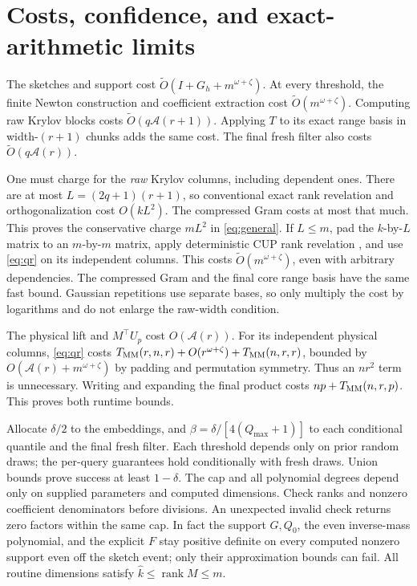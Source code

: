 \documentclass[11pt]{article}
\newcommand{\rank}{\operatorname{rank}}
\newcommand{\tO}{\widetilde O}
\newcommand{\MM}{T_{\rm MM}}
\newcommand{\Ac}{\mathcal A}
\begin{document}
\section{Costs, confidence, and exact-arithmetic limits}
The sketches and support cost \(\tO(I+G_h+m^{\omega+\zeta})\).
At every threshold, the finite Newton construction and coefficient
extraction cost \(\tO(m^{\omega+\zeta})\). Computing raw Krylov
blocks costs \(\tO(q\Ac(r+1))\). Applying \(T\) to its exact range
basis in width-\((r+1)\) chunks adds the same cost.
The final fresh filter also costs \(\tO(q\Ac(r))\).

One must charge for the \emph{raw} Krylov columns, including dependent
ones. There are at most \(L=(2q+1)(r+1)\), so conventional exact rank
revelation and orthogonalization cost \(O(kL^2)\). The compressed Gram
costs at most that much. This proves the conservative charge \(mL^2\)
in \eqref{eq:general}. If \(L\leq m\), pad the \(k\)-by-\(L\)
matrix to an \(m\)-by-\(m\) matrix, apply deterministic CUP rank
revelation \cite{jps}, and use \eqref{eq:qr} on its independent columns.
This costs \(\tO(m^{\omega+\zeta})\), even with arbitrary dependencies.
The compressed Gram and the final core range basis have the same fast
bound. Gaussian repetitions use separate bases, so only multiply the
cost by logarithms and do not enlarge the raw-width condition.

The physical lift and \(M^\top U_p\) cost \(O(\Ac(r))\).
For its independent physical columns, \eqref{eq:qr} costs
\(\MM(r,n,r)+O(r^{\omega+\zeta})+\MM(n,r,r)\), bounded by
\(O(\Ac(r)+m^{\omega+\zeta})\) by padding and permutation symmetry.
Thus an \(nr^2\) term is unnecessary. Writing and expanding the final
product costs \(np+\MM(n,r,p)\). This proves both runtime bounds.

Allocate \(\delta/2\) to the embeddings, and
\(\beta=\delta/[4(Q_{\max}+1)]\) to each conditional quantile and the
final fresh filter. Each threshold depends only on prior random draws;
the per-query guarantees hold conditionally with fresh draws. Union
bounds prove success at least \(1-\delta\). The cap and all polynomial
degrees depend only on supplied parameters and computed dimensions.
Check ranks and nonzero coefficient denominators before divisions.
An unexpected invalid check returns zero factors within the same cap.
In fact the support \(G,Q_0\), the even inverse-mass polynomial, and
the explicit \(F\) stay positive definite on every computed nonzero
support even off the sketch event; only their approximation bounds can
fail. All routine dimensions satisfy \(\widehat k\leq\rank M\leq m\).
\end{document}

